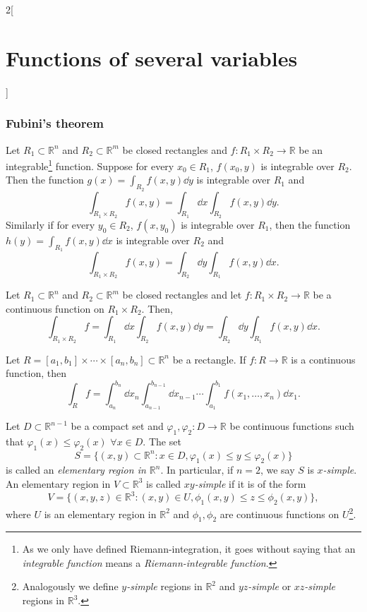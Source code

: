 \documentclass[../../../main.tex]{subfiles}
\begin{document}
\begin{multicols}{2}[\section{Functions of several variables}]
\subsubsection*{Fubini's theorem}
\begin{theorem}
Let $R_1\subset\mathbb{R}^n$ and $R_2\subset\mathbb{R}^m$ be closed rectangles and $f:R_1\times R_2\rightarrow\mathbb{R}$ be an integrable\footnote{As we only have defined Riemann-integration, it goes without saying that an \textit{integrable function} means a \textit{Riemann-integrable function}.} function. Suppose for every $x_0\in R_1$, $f(x_0,y)$ is integrable over $R_2$. Then the function $\displaystyle g(x)=\int_{R_2}f(x,y)\dd y$ is integrable over $R_1$ and $$\int_{R_1\times R_2}f(x,y)=\int_{R_1}\dd x\int_{R_2}f(x,y)\dd y.$$ Similarly if for every $y_0\in R_2$, $f(x,y_0)$ is integrable over $R_1$, then the function $\displaystyle h(y)=\int_{R_1}f(x,y)\dd x$ is integrable over $R_2$ and $$\int_{R_1\times R_2}f(x,y)=\int_{R_2}\dd y\int_{R_1}f(x,y)\dd x.$$
\begin{corollary}
Let $R_1\subset\mathbb{R}^n$ and $R_2\subset\mathbb{R}^m$ be closed rectangles and let $f:R_1\times R_2\rightarrow\mathbb{R}$ be a continuous function on $R_1\times R_2$. Then, $$\int_{R_1\times R_2}f=\int_{R_1}\dd x\int_{R_2}f(x,y)\dd y=\int_{R_2}\dd y\int_{R_1}f(x,y)\dd x.$$
\end{corollary}
\begin{corollary}
Let $R=[a_1,b_1]\times\cdots\times[a_n,b_n]\subset\mathbb{R}^n$ be a rectangle. If $f:R\rightarrow\mathbb{R}$ is a continuous function, then $$\int_Rf=\int_{a_n}^{b_n}\dd x_n\int_{a_{n-1}}^{b_{n-1}}\dd x_{n-1}\cdots\int_{a_1}^{b_1}f(x_1,\ldots,x_n)\dd x_1.$$
\end{corollary}
\begin{definition}
Let $D\subset\mathbb{R}^{n-1}$ be a compact set and $\varphi_1,\varphi_2:D\rightarrow\mathbb{R}$ be continuous functions such that $\varphi_1(x)\leq\varphi_2(x)$ $\forall x\in D$. The set $$S=\{(x,y)\subset\mathbb{R}^n:x\in D, \varphi_1(x)\leq y\leq\varphi_2(x)\}$$ is called an \textit{elementary region in $\mathbb{R}^n$}. In particular, if $n=2$, we say $S$ is \textit{$x$-simple}. An elementary region in $V\subset\mathbb{R}^3$ is called \textit{$xy$-simple} if it is of the form $$V=\{(x,y,z)\in\mathbb{R}^3:(x,y)\in U, \phi_1(x,y)\leq z\leq\phi_2(x,y)\},$$ where $U$ is an elementary region in $\mathbb{R}^2$ and $\phi_1,\phi_2$ are continuous functions on $U$\footnote{Analogously we define \textit{$y$-simple} regions in $\mathbb{R}^2$ and \textit{$yz$-simple} or \textit{$xz$-simple} regions in $\mathbb{R}^3$.}.

\end{definition}
\end{theorem}
\end{multicols}
\end{document}
